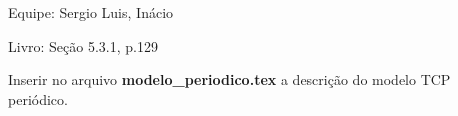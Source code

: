 Equipe: Sergio Luis, Inácio

Livro: Seção 5.3.1, p.129

Inserir no arquivo \textbf{modelo\_periodico.tex} a descrição do modelo TCP periódico. 
